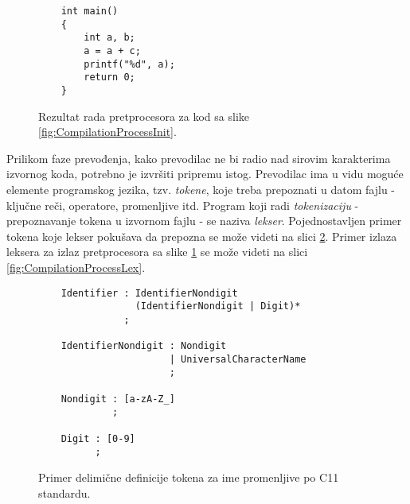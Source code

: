 \begin{figure}[h!]
    \begin{lstlisting}
    int main()
    {
        int a, b;
        a = a + c;
        printf("%d", a);
        return 0;
    }
    \end{lstlisting}
    \caption{Rezultat rada pretprocesora za kod sa slike 
             \ref{fig:CompilationProcessInit}.}
    \label{fig:CompilationProcessPrep}
\end{figure}

Prilikom faze prevođenja, kako prevodilac ne bi radio nad sirovim 
karakterima izvornog koda, potrebno je izvršiti pripremu istog. 
Prevodilac ima u vidu moguće elemente programskog jezika, tzv. 
\emph{tokene}, koje treba prepoznati u datom fajlu - ključne reči, 
operatore, promenljive itd. Program koji radi \emph{tokenizaciju} -
prepoznavanje tokena u izvornom fajlu - se naziva \emph{lekser}. 
Pojednostavljen primer tokena koje lekser pokušava da prepozna 
se može videti na slici \ref{fig:CLexerExample}. Primer izlaza
leksera za izlaz pretprocesora sa slike \ref{fig:CompilationProcessPrep}
se može videti na slici \ref{fig:CompilationProcessLex}.

\begin{figure}[h!]
    \begin{lstlisting}
    Identifier : IdentifierNondigit 
                 (IdentifierNondigit | Digit)*
               ;

    IdentifierNondigit : Nondigit
                       | UniversalCharacterName
                       ;

    Nondigit : [a-zA-Z_]
             ;

    Digit : [0-9]
          ;
    \end{lstlisting}
    \caption{Primer delimične definicije tokena za ime promenljive po C11 standardu.}
    \label{fig:CLexerExample}
\end{figure}

